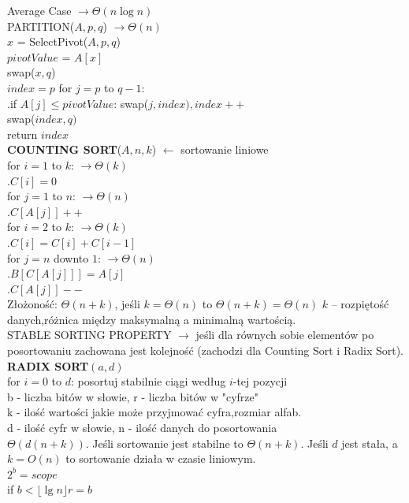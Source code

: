 \documentclass[8pt,a3paper]{article}
\begin{document}
\begin{multicols*}{3}
	Average Case $\to \Theta(n \log n)$ \\
	PARTITION($A,p,q$) $\to \Theta(n)$\\
	$x$ = SelectPivot($A,p,q$) \\
	$pivotValue$ = $A[x]$ \\
	swap($x, q$) \\
	$index = p$
	for $j=p$ to $q-1$: \\
	.\quad if $A[j] \leq pivotValue$: \quad swap($j,index), index++$ \\
	swap($index,q)$\\
	return $index$ \\
	\textbf{COUNTING SORT}($A,n,k$) $\gets$ sortowanie liniowe\\
	for $i=1$ to $k$: {\color{BrickRed}$\to \Theta(k)$ }\\
	.\quad $C[i]=0$ \\
	for $j=1$ to $n$: {\color{BrickRed}$\to \Theta(n)$} \\
	.\quad $C[A[j]]++$ \\
	for $i=2$ to $k$:  {\color{BrickRed}$\to \Theta(k)$} \\
	.\quad $C[i] = C[i] + C[i-1]$ \\
	for $j=n$ downto $1$: {\color{BrickRed}$\to \Theta(n)$} \\
	.\quad $B[C[A[j]]] = A[j]$ \\
	.\quad $C[A[j]]--$ \\
	Złożoność: $\Theta(n+k)$, jeśli $k=\Theta(n)$ to $\Theta(n+k) = \Theta(n)$ $k$ – rozpiętość danych,różnica między maksymalną a minimalną wartością.  \\
	STABLE SORTING PROPERTY $\to$ jeśli dla równych sobie elementów po posortowaniu zachowana jest kolejność (zachodzi dla Counting Sort i Radix Sort).
	\textbf{RADIX SORT}$(a,d)$ \\
	for $i=0$ to $d$: posortuj stabilnie ciągi według $i$-tej pozycji \\
	b - liczba bitów w słowie, r - liczba bitów w "cyfrze" \\
	k - ilość wartości jakie może przyjmować cyfra,rozmiar alfab.\\
	d - ilość cyfr w słowie, n - ilość danych do posortowania \\
	$\Theta(d(n+k)).$ Jeśli sortowanie jest stabilne to $\Theta(n+k)$. Jeśli $d$ jest stała, a $k=O(n)$ to sortowanie działa w czasie liniowym. \\
	$2^{b}=scope$ \\
	if $b<\lfloor \lg n \rfloor {r=b}$ \\

\end{multicols*}
\end{document}
